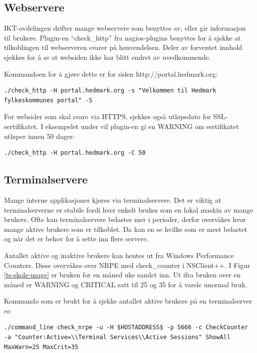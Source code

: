 \subsection{Webservere}\label{sec:webservere}
IKT-avdelingen drifter mange webservere som benyttes av, eller gir informasjon til brukere. Plugin-en ``check\_http'' \cite{checkhttp} fra nagios-plugins benyttes for å sjekke at tilkoblingen til webserveren svarer på henvendelsen. Deler av forventet innhold sjekkes for å se at websiden ikke har blitt endret av uvedkommende.

Kommandoen for å gjøre dette er for siden http://portal.hedmark.org:
\begin{lstlisting}[style=example]
./check_http -H portal.hedmark.org -s "Velkommen til Hedmark fylkeskommunes portal" -S 
\end{lstlisting}

For websider som skal svare via HTTPS, sjekkes også utløpsdato for SSL-sertifikatet. I eksempelet under vil plugin-en gi en WARNING om sertifikatet utløper innen 50 dager:
\begin{lstlisting}[style=example]
./check_http -H portal.hedmark.org -C 50
\end{lstlisting}

\clearpage
\subsection{Terminalservere}\label{sec:terminalservere}
Mange interne applikasjoner kjøres via terminalservere. Det er viktig at terminalserverne er stabile fordi hver enkelt brukes som en lokal maskin av mange brukere. Ofte kan terminalservere belastes mer i perioder, derfor overvåkes hvor mange aktive brukere som er tilkoblet. Da kan en se hvilke som er mest belastet og når det er behov for å sette inn flere servere.

Antallet aktive og inaktive brukere kan hentes ut fra Windows Performance Counters. Disse overvåkes over NRPE med check\_counter i NSClient++. I Figur \ref{ts-skole-usage} er bruken for en måned uke samlet inn. Ut ifra bruken over en måned er WARNING og CRITICAL satt til 25 og 35 for å varsle unormal bruk.

Kommando som er brukt for å sjekke antallet aktive brukere på en terminalserver er:
\begin{lstlisting}[style=example]
./command_line check_nrpe -u -H $HOSTADDRESS$ -p 5666 -c CheckCounter -a "Counter:Active=\\Terminal Services\\Active Sessions" ShowAll MaxWarn=25 MaxCrit=35
\end{lstlisting}

